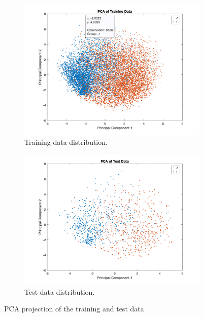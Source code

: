 \documentclass{article}
\begin{document}
\begin{figure}[H]
  \centering
  \begin{subfigure}[b]{0.45\textwidth}
    \centering
    \includegraphics[width=\textwidth]{images/train_data.png}
    \caption{Training data distribution.}
    \label{fig:train_data}
  \end{subfigure}
  \begin{subfigure}[b]{0.45\textwidth}
    \centering
    \includegraphics[width=\textwidth]{images/test_data.png}
    \caption{Test data distribution.}
    \label{fig:test_data}
  \end{subfigure}
  \caption{PCA projection of the training and test data}
  \label{fig:side_by_side_images}
\end{figure}
\end{document}
